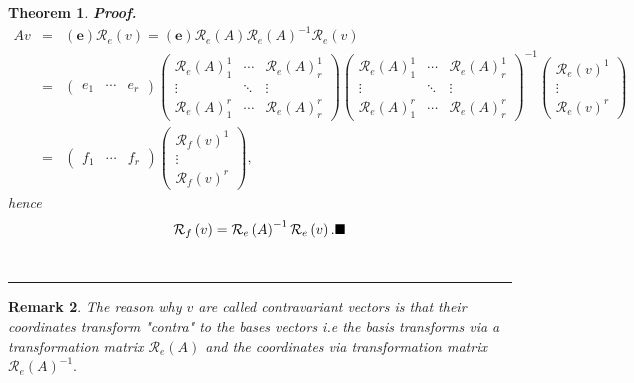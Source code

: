 \documentclass[aps,preprint]{revtex4}
\newtheorem{theorem}{Theorem}
\newtheorem{remark}[theorem]{Remark}
\newenvironment{proof}[1][Proof]{\noindent\textbf{#1.} }{\ \rule{0.5em}{0.5em}}
\begin{document}
\begin{theorem}
\begin{proof}
\begin{eqnarray}
Av &=&\left( \boldsymbol{e}\right) \mathcal{R}_{e}\left( v\right) =\left( 
\boldsymbol{e}\right) \mathcal{R}_{e}\left( A\right) \mathcal{R}_{e}\left(
A\right) ^{-1}\mathcal{R}_{e}\left( v\right) \\
&=&\left( 
\begin{array}{ccc}
e_{1} & \cdots & e_{r}%
\end{array}%
\right) \left( 
\begin{array}{ccc}
\mathcal{R}_{e}\left( A\right) _{1}^{1} & \cdots & \mathcal{R}_{e}\left(
A\right) _{r}^{1} \\ 
\vdots & \ddots & \vdots \\ 
\mathcal{R}_{e}\left( A\right) _{1}^{r} & \cdots & \mathcal{R}_{e}\left(
A\right) _{r}^{r}%
\end{array}%
\right) \left( 
\begin{array}{ccc}
\mathcal{R}_{e}\left( A\right) _{1}^{1} & \cdots & \mathcal{R}_{e}\left(
A\right) _{r}^{1} \\ 
\vdots & \ddots & \vdots \\ 
\mathcal{R}_{e}\left( A\right) _{1}^{r} & \cdots & \mathcal{R}_{e}\left(
A\right) _{r}^{r}%
\end{array}%
\right) ^{-1}\left( 
\begin{array}{c}
\mathcal{R}_{e}\left( v\right) ^{1} \\ 
\vdots \\ 
\mathcal{R}_{e}\left( v\right) ^{r}%
\end{array}%
\right) \\
&=&\left( 
\begin{array}{ccc}
f_{1} & \cdots & f_{r}%
\end{array}%
\right) \left( 
\begin{array}{c}
\mathcal{R}_{f}\left( v\right) ^{1} \\ 
\vdots \\ 
\mathcal{R}_{f}\left( v\right) ^{r}%
\end{array}%
\right) ,
\end{eqnarray}%
hence 
\begin{equation}
\mathcal{R}_{f}\left( v\right) =\mathcal{R}_{e}\left( A\right) ^{-1}\mathcal{%
R}_{e}\left( v\right) .\blacksquare
\end{equation}
\end{proof}
\end{theorem}

\begin{remark}
The reason why $v$ are called \emph{contravariant }vectors is that their
coordinates transform "contra" to the bases vectors i.e the basis transforms
via a transformation matrix $\mathcal{R}_{e}\left( A\right) $ and the
coordinates via transformation matrix $\mathcal{R}_{e}\left( A\right) ^{-1}.$
\end{remark}
\end{document}
